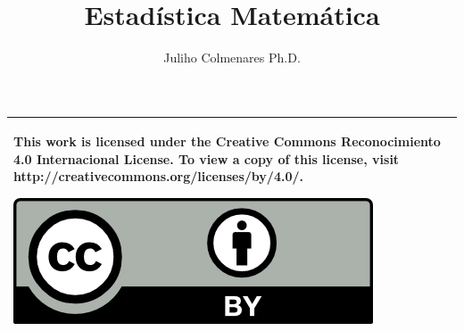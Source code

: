 \documentclass[
12pt,
]{tufte-book}
\title{Estadística Matemática}
\author{Juliho Colmenares Ph.D.}
\begin{document}
	\maketitle
\begin{tabular}{|p{}|}
	\hline
	This work is licensed under the Creative Commons Reconocimiento 4.0 Internacional License. To view a copy of this license, visit
	http://creativecommons.org/licenses/by/4.0/.
	\begin{center}
		\includegraphics[scale=1]{./licencia/by.png}
	\end{center}\\
	\hline
\end{tabular}
\tableofcontents








\end{document}

